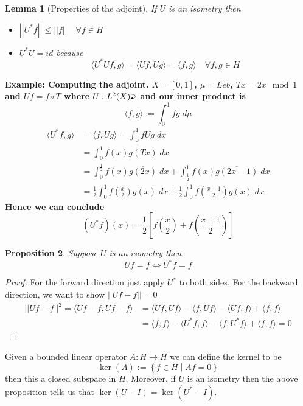 \documentclass[11pt]{article}
\newcommand{\defeq}{:=}
\newcommand{\norm}[1]{\left|\left|#1\right|\right|}
\newcommand{\relmiddle}[1]{\mathrel{}\middle#1\mathrel{}}
\newcommand{\rmv}{\relmiddle|}
\newcommand{\toitself}{\mathbin{\scalebox{.85}{%
    \lefteqn{\scalebox{.5}{$\blacktriangleleft$}}\raisebox{.34ex}{$\supset$}}}}
\newcommand{\mdf}[1]{{\color{RoyalBlue} #1}}
\newenvironment{eg}
	{\begin{mdframed}[backgroundcolor=mylg,roundcorner=5pt,linewidth=0pt]\bfseries{Example:}\normalfont}
	{\end{mdframed}}
\newtheorem{prop}{Proposition}[section]
\newtheorem{lemma}[prop]{Lemma}
\begin{document}
\begin{lemma}[Properties of the adjoint]
If $U$ is an isometry then 
\begin{itemize}
	\item $\norm{U^\ast f} \leq \norm{f} \quad \forall f\in H$
	\item $U^\ast U = id $ because
		\[
		\langle U^\ast U f, g \rangle = \langle Uf, Ug\rangle = \langle f, g\rangle \quad \forall f,g \in H
		\]
\end{itemize}
\end{lemma}
\begin{eg}
	\textbf{Computing the adjoint.}
	$X=[0,1]$, $\mu=Leb$, $Tx=2x \mod 1$ and $Uf = f\circ T$ where $U:L^2(X)\toitself$ and our inner product is
	\[
		\langle f, g\rangle \defeq \int_0^1 f \overline{g} \; d\mu
	\]
	\begin{align*}
		\langle U^\ast f, g\rangle & = \langle f, Ug\rangle = \int_0^1 f \overline{Ug} \; dx \\
								   & = \int_0^1 f(x)\overline{g(Tx)}\; dx \\
								   & = \int_0^{\frac{1}{2}} f(x)\overline{g(2x)} \; dx + \int_{\frac{1}{2}}^1 f(x)\overline{g(2x-1)}\; dx \\
								   & = \frac{1}{2}\int_0^1 f\left( \frac{x}{2}\right)\overline{g(x)}\; dx + 
										\frac{1}{2}\int_0^1 f\left( \frac{x+1}{2}\right)\overline{g(x)}\; dx
	\end{align*}
	Hence we can conclude 
	\[
		(U^\ast f)(x) = \frac{1}{2}\left[ f \left( \frac{x}{2}\right) + f \left( \frac{x+1}{2}\right)\right]
	\]
\end{eg}

\begin{prop}
Suppose $U$ is an isometry then
\[
Uf=f \iff U^\ast f = f
\]
\end{prop}

\begin{proof}
For the forward direction just apply $U^\ast$ to both sides.
For the backward direction, we want to show $\norm{Uf - f}=0$
\begin{align*}
	\norm{Uf-f}^2 = \langle Uf -f, Uf -f\rangle
	&= \langle Uf, Uf\rangle - \langle f, Uf\rangle - \langle Uf, f\rangle + \langle f, f\rangle \\
	&= \langle f, f\rangle - \langle U^\ast f, f\rangle - \langle f, U^\ast f\rangle + \langle f, f\rangle=0
\end{align*}
\end{proof}

Given a bounded linear operator $A:H\to H$ we can define the \mdf{kernel} to be
\[
	\ker(A) \defeq \left\{ f\in H \rmv Af = 0\right\}
\]
then this a closed subspace in $H$.
Moreover, if $U$ is an isometry then the above proposition tells us that $\ker(U-I)=\ker(U^\ast - I)$.
\end{document}
